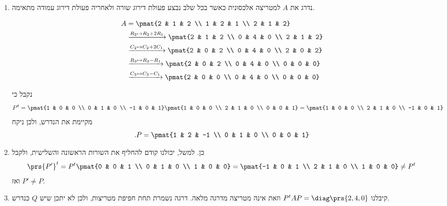 \documentclass[a4paper,10pt,twoside,openany]{book}
\begin{document}
\begin{solution}
\begin{enumerate}
\item 

נדרג את
$A$
למטריצה אלכסונית כאשר בכל שלב נבצע פעולת דירוג שורה ולאחריה פעולת דירוג עמודה מתאימה.

\begin{align*}
    A &= \pmat{2 & 1 & 2 \\ 1 & 2 & 1 \\ 2 & 1 & 2}
    \\&\xrightarrow{R_2 \mapsto R_2 + 2 R_1}
    \pmat{2 & 1 & 2 \\ 0 & 4 & 0 \\ 2 & 1 & 2}
    \\&\xrightarrow{C_2 \mapsto C_2 + 2 C_1}
    \pmat{2 & 0 & 2 \\ 0 & 4 & 0 \\ 2 & 0 & 2}
    \\&\xrightarrow{R_3 \mapsto R_3 - R_1}
    \pmat{2 & 0 & 2 \\ 0 & 4 & 0 \\ 0 & 0 & 0}
    \\&\xrightarrow{C_3 \mapsto C_3 - C_1}
    \pmat{2 & 0 & 0 \\ 0 & 4 & 0 \\ 0 & 0 & 0}
\end{align*}

נקבל כי
\[P^t = \pmat{1 & 0 & 0 \\ 0 & 1 & 0 \\ -1 & 0 & 1} \pmat{1 & 0 & 0 \\ 2 & 1 & 0 \\ 0 & 0 & 1} = \pmat{1 & 0 & 0 \\ 2 & 1 & 0 \\ -1 & 0 & 1}\]
מקיימת את הנדרש, ולכן ניקח
\[\text{.} P = \pmat{1 & 2 & -1 \\ 0 & 1 & 0 \\ 0 & 0 & 1}\]

\item כן. למשל, יכולנו קודם להחליף את השורות הראשונה והשלישית, ולקבל
\[\prs{P'}^t = P^t \pmat{0 & 0 & 1 \\ 0 & 1 & 0 \\ 1 & 0 & 0} = \pmat{-1 & 0 & 1 \\ 2 & 1 & 0 \\ 1 & 0 & 0} \neq P^t\]
ואז
$P' \neq P$.

\item קיבלנו
$P^t A P = \diag\prs{2,4,0}$
וזאת אינה מטריצה מדרגה מלאה. דרגה נשמרת תחת חפיפת מטריצות, ולכן לא יתכן שיש
$Q$
כנדרש.


\end{enumerate}
\end{solution}
\end{document}

